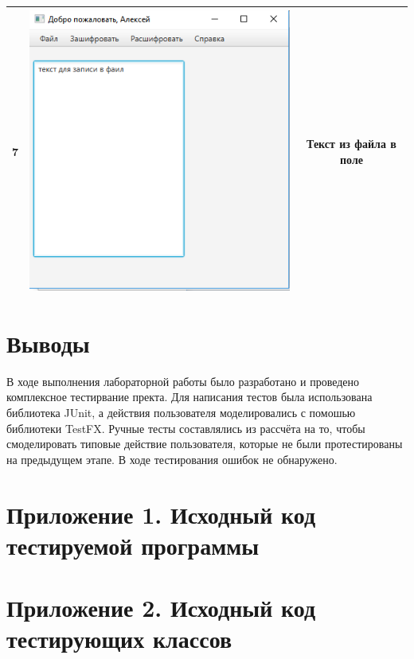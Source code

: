 \documentclass[a4paper,12pt]{article}
\begin{document}
\begin{table}[pt!]
\begin{tabular}{|c|c|c|}
	7 & \includegraphics[scale=0.3]{img/file/open/text_open4.png} & Текст из файла в поле\\
	\hline
\end{tabular} 
\label{table:data_type5} 
\end{table}

\newpage\section*{Выводы}
В ходе выполнения лабораторной работы было разработано и проведено комплексное тестирвание пректа. Для написания тестов была использована библиотека JUnit, а действия пользователя моделировались с помошью библиотеки TestFX. Ручные тесты составлялись из рассчёта на то, чтобы смоделировать типовые действие пользователя, которые не были протестированы на предыдущем этапе. В ходе тестирования ошибок не обнаружено.

\newpage\section*{Приложение 1. Исходный код тестируемой программы}

\newpage\section*{Приложение 2. Исходный код тестирующих классов}
\end{document}
